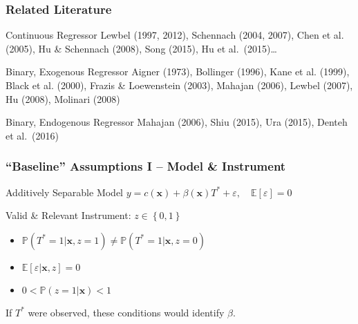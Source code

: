 \documentclass{beamer}
\begin{document}
\begin{frame}
  \frametitle{Related Literature}
 
  \begin{block}{Continuous Regressor}
    \small
  Lewbel (1997, 2012), Schennach (2004, 2007), Chen et al. (2005), Hu \& Schennach (2008), Song (2015), Hu et al.\ (2015)\ldots 
  \end{block}

  \begin{block}{Binary, Exogenous Regressor}
    \small
   Aigner (1973), Bollinger (1996), Kane et al. (1999), Black et al. (2000), Frazis \& Loewenstein (2003), Mahajan (2006), Lewbel (2007), Hu (2008), Molinari (2008)
  \end{block}

  \begin{block}{Binary, Endogenous Regressor}
    \alert{Mahajan (2006)}, \small Shiu (2015), Ura (2015), Denteh et al.\ (2016)  
  \end{block}
\end{frame}
\begin{frame}
  \frametitle{``Baseline'' Assumptions I -- Model \& Instrument}

  \begin{block}{Additively Separable Model}
    $y = c(\mathbf{x}) + \beta(\mathbf{x}) T^* + \varepsilon, \quad \mathbb{E}[ \varepsilon] = 0$ 
  \end{block}

  \begin{block}{Valid \& Relevant Instrument: $z \in \left\{ 0,1 \right\}$}
    \begin{itemize}
      \item $\mathbb{P}(T^*=1|\mathbf{x},z=1) \neq \mathbb{P}(T^*=1|\mathbf{x},z=0)$
      \item $\mathbb{E}[\varepsilon|\mathbf{x},z] = 0$
      \item $0 < \mathbb{P}(z=1|\mathbf{x}) < 1$
    \end{itemize}
  \end{block}

  \begin{alertblock}{If $T^*$ were observed, these conditions would identify $\beta$.}
  \end{alertblock}
\end{frame}
\end{document}
